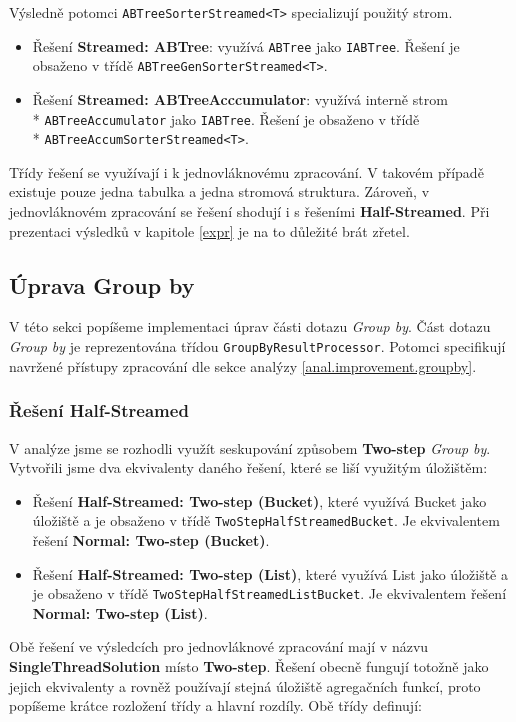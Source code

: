 Výsledně potomci \texttt{ABTreeSorterStreamed<T>} specializují použitý strom.
\begin{itemize}
\item Řešení \textbf{Streamed: ABTree}: využívá \texttt{ABTree} jako \texttt{IABTree}.
Řešení je obsaženo v třídě \texttt{ABTreeGenSorterStreamed<T>}.
\item Řešení \textbf{Streamed: ABTreeAcccumulator}: využívá interně strom\\* \texttt{ABTreeAccumulator} jako \texttt{IABTree}.
Řešení je obsaženo v třídě\\* \texttt{ABTreeAccumSorterStreamed<T>}.
\end{itemize}

Třídy řešení se využívají i k jednovláknovému zpracování.
V takovém případě existuje pouze jedna tabulka a jedna stromová struktura.
Zároveň, v jednovláknovém zpracování se řešení shodují i s řešeními \textbf{Half-Streamed}.
Při prezentaci výsledků v kapitole \ref{expr} je na to důležité brát zřetel.

\subsection{Úprava Group by}

V této sekci popíšeme implementaci úprav části dotazu \textit{Group by}.
Část dotazu \textit{Group by} je reprezentována třídou \texttt{GroupByResultProcessor}.
Potomci specifikují navržené přístupy zpracování dle sekce analýzy \ref{anal.improvement.groupby}.

\subsubsection{Řešení Half-Streamed}

V analýze jsme se rozhodli využít seskupování způsobem \textbf{Two-step} \textit{Group by}.
Vytvořili jsme dva ekvivalenty daného řešení, které se liší využitým úložištěm: 
\begin{itemize}
\item Řešení \textbf{Half-Streamed: Two-step (Bucket)}, které využívá Bucket jako úložiště a je obsaženo v třídě \texttt{TwoStepHalfStreamedBucket}.
Je ekvivalentem řešení \textbf{Normal: Two-step (Bucket)}.
\item Řešení \textbf{Half-Streamed: Two-step (List)}, které využívá List jako úložiště a je obsaženo v třídě \texttt{TwoStepHalfStreamedListBucket}.
Je ekvivalentem řešení \textbf{Normal: Two-step (List)}.
\end{itemize}
Obě řešení ve výsledcích pro jednovláknové zpracování mají v názvu \textbf{SingleThreadSolution} místo \textbf{Two-step}.
Řešení obecně fungují totožně jako jejich ekvivalenty a rovněž používají stejná úložiště agregačních funkcí, proto popíšeme krátce rozložení třídy a hlavní rozdíly.
Obě třídy definují:

